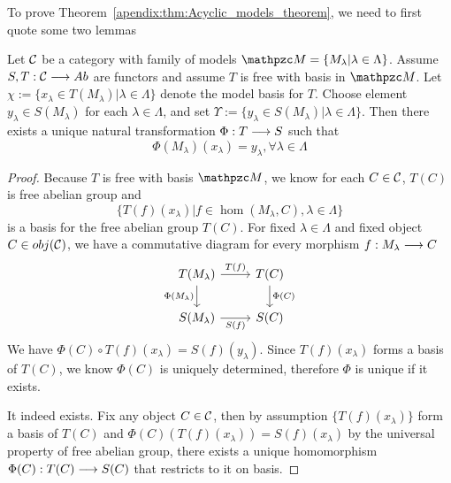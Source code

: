 \documentclass[11pt]{book} %
\begin{document}
\begin{proposition}
To prove Theorem~\ref{apendix:thm:Acyclic_models_theorem}, we need to first quote some two lemmas
\begin{lemma}\label{apendixA:lem:A.1.3}
Let ${\cal C}$ be a category with family of models $\pzm=\{M_\lambda|\lambda\in \Lambda\}$. Assume $S,T:{\cal C}\longrightarrow Ab$ are functors and assume $T$ is free with basis in $\pzm$. Let
$\chi:=\{x_\lambda\in T(M_\lambda)|\lambda\in \Lambda\}$ denote the model basis for $T$. Choose element $y_\lambda\in S(M_\lambda)$ for each $\lambda\in \Lambda$, and set $\Upsilon:=\{y_\lambda\in S(M_\lambda)|\lambda\in\Lambda\}$. Then there exists a unique natural transformation $\Phi:T\longrightarrow S$ such that 
$$
\Phi(M_\lambda)(x_\lambda)=y_\lambda,\forall \lambda\in \Lambda
$$
\end{lemma}
\begin{proof}
Because $T$ is free with basis $\pzm$, we know for each $C\in{\cal C}$, $T(C)$ is free abelian group and
$$
\{T(f)(x_\lambda)|f\in \hom(M_\lambda,C), \lambda\in \Lambda\}
$$
is a basis for the free abelian group $T(C)$. For fixed $\lambda\in \Lambda$ and fixed object $C\in obj({\cal C})$, we have a commutative diagram for every morphism $f: M_\lambda\longrightarrow C$
\[
\begin{tikzcd}
T(M_\lambda) \arrow[r, "T(f)"] \arrow[d, "\Phi(M_\lambda)"'] & T(C) \arrow[d, "\Phi(C)"] \\
S(M_\lambda) \arrow[r, "S(f)"'] & S(C)
\end{tikzcd}
\]
We have $\Phi(C)\circ T(f)(x_\lambda)=S(f)(y_\lambda)$. Since $T(f)(x_\lambda)$ forms a basis of $T(C)$, we know $\Phi(C)$ is uniquely determined, therefore $\Phi$ is unique if it exists.

It indeed exists. Fix any object $C\in {\cal C}$, then by assumption $\{T(f)(x_\lambda)\}$ form a basis of $T(C)$ and $\Phi(C)(T(f)(x_\lambda))=S(f)(x_\lambda)$ by the universal property of free abelian group, there exists a unique homomorphism $\Phi(C):T(C)\longrightarrow S(C)$ that restricts to it on basis. 


\end{proof}
\end{proposition}
\end{document}
